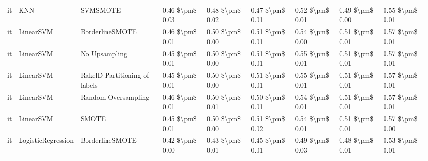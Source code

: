 \begin{tabular}{lllllllll}
      it &                             KNN &                      SVMSMOTE & 0.46 \$\textbackslash pm\$ 0.03 &           0.48 \$\textbackslash pm\$ 0.02 &       0.47 \$\textbackslash pm\$ 0.01 &        0.52 \$\textbackslash pm\$ 0.01 &                         0.49 \$\textbackslash pm\$ 0.00 &     0.55 \$\textbackslash pm\$ 0.01 \\
      it &                       LinearSVM &               BorderlineSMOTE & 0.46 \$\textbackslash pm\$ 0.01 &           0.50 \$\textbackslash pm\$ 0.00 &       0.51 \$\textbackslash pm\$ 0.01 &        0.54 \$\textbackslash pm\$ 0.00 &                         0.51 \$\textbackslash pm\$ 0.01 &     0.57 \$\textbackslash pm\$ 0.01 \\
      it &                       LinearSVM &                 No Upsampling & 0.45 \$\textbackslash pm\$ 0.01 &           0.50 \$\textbackslash pm\$ 0.00 &       0.51 \$\textbackslash pm\$ 0.01 &        0.55 \$\textbackslash pm\$ 0.01 &                         0.51 \$\textbackslash pm\$ 0.01 &     0.57 \$\textbackslash pm\$ 0.01 \\
      it &                       LinearSVM & RakelD Partitioning of labels & 0.45 \$\textbackslash pm\$ 0.01 &           0.50 \$\textbackslash pm\$ 0.00 &       0.51 \$\textbackslash pm\$ 0.01 &        0.55 \$\textbackslash pm\$ 0.01 &                         0.51 \$\textbackslash pm\$ 0.01 &     0.57 \$\textbackslash pm\$ 0.01 \\
      it &                       LinearSVM &           Random Oversampling & 0.46 \$\textbackslash pm\$ 0.01 &           0.50 \$\textbackslash pm\$ 0.01 &       0.50 \$\textbackslash pm\$ 0.01 &        0.54 \$\textbackslash pm\$ 0.01 &                         0.51 \$\textbackslash pm\$ 0.01 &     0.57 \$\textbackslash pm\$ 0.01 \\
      it &                       LinearSVM &                         SMOTE & 0.45 \$\textbackslash pm\$ 0.01 &           0.50 \$\textbackslash pm\$ 0.00 &       0.51 \$\textbackslash pm\$ 0.02 &        0.54 \$\textbackslash pm\$ 0.01 &                         0.51 \$\textbackslash pm\$ 0.01 &     0.57 \$\textbackslash pm\$ 0.00 \\
      it &              LogisticRegression &               BorderlineSMOTE & 0.42 \$\textbackslash pm\$ 0.00 &           0.43 \$\textbackslash pm\$ 0.01 &       0.45 \$\textbackslash pm\$ 0.01 &        0.49 \$\textbackslash pm\$ 0.03 &                         0.48 \$\textbackslash pm\$ 0.01 &     0.53 \$\textbackslash pm\$ 0.01 \\

\end{tabular}
